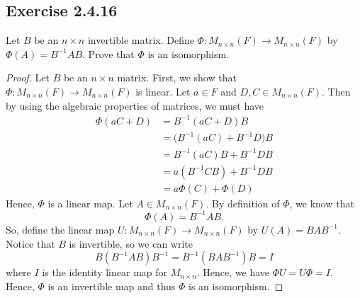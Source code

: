 \subsection*{Exercise 2.4.16} Let \( B  \) be an \( n \times n  \) invertible matrix. Define \( \Phi: {M}_{n \times n}(F) \to {M}_{n \times n }(F) \) by \( \Phi(A) = B^{-1} A B  \). Prove that \( \Phi  \) is an isomorphism.
\begin{proof}
    Let \( B  \) be an \( n \times n  \) matrix. First, we show that \( \Phi: {M}_{n \times n}(F) \to {M}_{n \times n}(F)   \) is linear. 
    Let \( a \in F  \) and \( D, C \in {M}_{n \times n}(F) \). Then by using the algebraic properties of matrices, we must have
    \begin{align*}
        \Phi(aC + D) &= B^{-1}(aC + D)B \\
                  &=  \Big( B^{-1}(aC) + B^{-1}D \Big) B \\ 
                  &= B^{-1}(aC)B + B^{-1} D B \\
                  &= a (B^{-1} C B) + B^{-1}D B \\
                  &= a\Phi(C) + \Phi(D)
    \end{align*}
    Hence, \( \Phi  \) is a linear map. Let \( A \in {M}_{n \times n }(F) \). By definition of \( \Phi  \), we know that 
    \[  \Phi(A) = B^{-1}A B. \]
    So, define the linear map \( U: {M}_{n \times n}(F) \to {M}_{n \times n}(F) \) by \( U(A) = B A B^{-1} \).
    Notice that \( B  \) is invertible, so we can write
    \[  B (B^{-1} A B) B^{-1}  = B^{-1} (B A B^{-1}) B = I \] where \( I  \) is the identity linear map for \( {M}_{n \times n } \).
    Hence, we have \( \Phi U = U \Phi = I  \). Hence, \( \Phi  \) is an invertible map and thus \( \Phi  \) is an isomorphism.
\end{proof}

